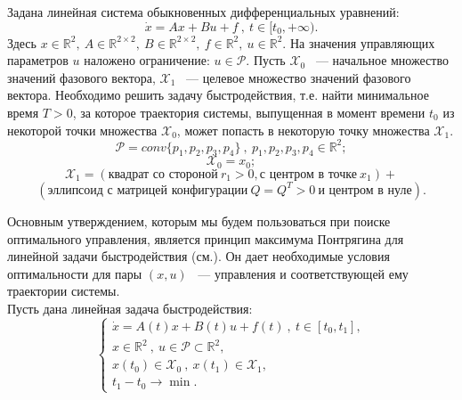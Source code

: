 \documentclass[10pt]{article}
\begin{document}
Задана линейная система обыкновенных дифференциальных уравнений:\\
\[ \dot{x} = Ax + Bu + f  \  , \ t \in [t_0, +\infty).\]
Здесь \(x \in \mathbb{R}^2, \ A \in \mathbb{R}^{2 \times 2}, \ B \in \mathbb{R}^{2 \times 2}, \ f \in \mathbb{R}^2, \ u \in \mathbb{R}^2 .\) На значения управляющих параметров \(u\) наложено ограничение: \(u \in \mathcal{P}.\) Пусть \( \mathcal{X}_0\) ~--- начальное множество значений фазового вектора, \(\mathcal{X}_1\) ~--- целевое множество значений фазового вектора. Необходимо решить задачу быстродействия, т.е. найти минимальное время \(T > 0\), за которое траектория системы, выпущенная в момент времени \(t_0\) из некоторой точки множества \(\mathcal{X}_0\), может попасть в некоторую точку множества \(\mathcal{X}_1\).
\bigskip
\[ \mathcal{P} = conv\{p_1, p_2, p_3, p_4\} \ , \ p_1, p_2, p_3, p_4 \in \mathbb{R}^2;\]
\[\mathcal{X}_0 = {x_0};\]
\[\mathcal{X}_1 = (\text{квадрат со стороной} \ r_1 > 0, \text{с центром в точке} \ x_1) + \] 
\[(\text{эллипсоид с матрицей конфигурации} \ Q = Q^T > 0  \ \text{и центром в нуле}).  \]


Основным утверждением, которым мы будем пользоваться при поиске оптимального управления, является принцип максимума Понтрягина для линейной задачи быстродействия (см.\cite{1}). Он дает необходимые условия оптимальности для пары \( (x, u)\) ~--- управления и соответствующей ему траектории системы.\bigskip \\
Пусть дана линейная задача быстродействия:
\begin{equation}
 \begin{cases}
   \dot{x} = A(t)x + B(t)u + f(t) \ , \ t \in [t_0, t_1],
   \\
   x \in \mathbb{R}^2 \ , \ u \in \mathcal{P} \subset \mathbb{R}^2,
   \\
   x(t_0) \in \mathcal{X}_0 \ , \ x(t_1) \in \mathcal{X}_1,
   \\
   t_1 - t_0 \to \min.
 \end{cases}
 \label{problem}
\end{equation}
\end{document}
